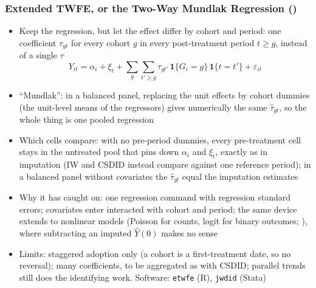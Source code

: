 \documentclass[xcolor=svgnames,9pt,english, aspectratio=169]{beamer}
\begin{document}
\begin{frame}[t]
  \frametitle{Extended TWFE, or the Two-Way Mundlak Regression (\cite{wooldridge2025twoway})}
\begin{itemize}\itemsep0.55em
\item<1-> Keep the regression, but let the effect differ by cohort and period: one coefficient $\tau_{gt}$ for every cohort $g$ in every post-treatment period $t \geq g$, instead of a single $\tau$
\begin{equation*}
Y_{it} = \alpha_i + \xi_t + \sum_{g} \sum_{t' \geq g} \tau_{gt'}\, \mathbf{1}\{G_i = g\}\, \mathbf{1}\{t = t'\} + \varepsilon_{it}
\end{equation*}
\item<2-> ``Mundlak'': in a balanced panel, replacing the unit effects by cohort dummies (the unit-level means of the regressors) gives numerically the same $\hat{\tau}_{gt}$, so the whole thing is one pooled regression
\item<3-> Which cells compare: with no pre-period dummies, every pre-treatment cell stays in the untreated pool that pins down $\alpha_i$ and $\xi_t$, exactly as in imputation (IW and CSDID instead compare against one reference period); in a balanced panel without covariates the $\hat{\tau}_{gt}$ equal the imputation estimates
\item<4-> Why it has caught on: one regression command with regression standard errors; covariates enter interacted with cohort and period; the same device extends to \alert{nonlinear models} (Poisson for counts, logit for binary outcomes; \cite{wooldridge2023simple}), where subtracting an imputed $\hat{Y}(0)$ makes no sense
\item<5-> Limits: staggered adoption only (a cohort is a first-treatment date, so no reversal); many coefficients, to be aggregated as with CSDID; parallel trends still does the identifying work. Software: \texttt{etwfe} (R), \texttt{jwdid} (Stata)
\end{itemize}
\end{frame}
\end{document}
